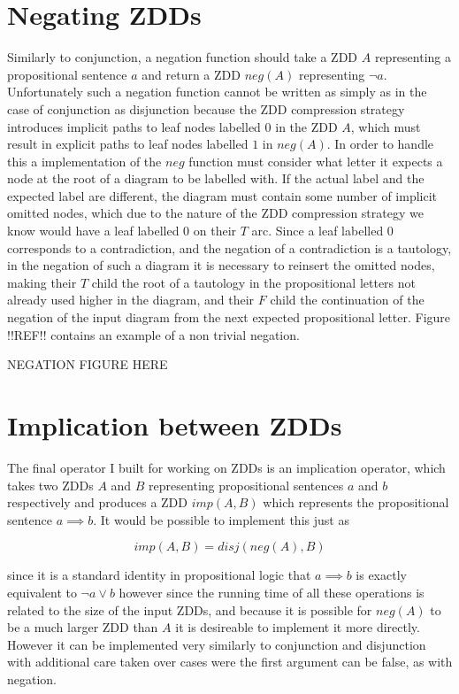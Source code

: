 \documentclass[12pt,a4paper,twoside,openright]{report}
\begin{document}
\section{Negating ZDDs}
Similarly to conjunction, a negation function should take a ZDD $A$ representing a propositional sentence $a$ and return a ZDD $\mathit{neg}(A)$ representing $\neg a$. Unfortunately such a negation function cannot be written as simply as in the case of conjunction as disjunction because the ZDD compression strategy introduces implicit paths to leaf nodes labelled $0$ in the ZDD $A$, which must result in explicit paths to leaf nodes labelled $1$ in $\mathit{neg}(A)$. In order to handle this a implementation of the $\mathit{neg}$ function must consider what letter it expects a node at the root of a diagram to be labelled  with. If the actual label and the expected label are different, the diagram must contain some number of implicit omitted nodes, which due to the nature of the ZDD compression strategy we know would have a leaf labelled $0$ on their $T$ arc. Since a leaf labelled $0$ corresponds to a contradiction, and the negation of a contradiction is a tautology, in the negation of such a diagram it is necessary to reinsert the omitted nodes, making their $T$ child the root of a tautology in the propositional letters not already used higher in the diagram, and their $F$ child the continuation of the negation of the input diagram from the next expected propositional letter. Figure !!REF!! contains an example of a non trivial negation.

NEGATION FIGURE HERE

\section{Implication between ZDDs}
The final operator I built for working on ZDDs is an implication operator, which takes two ZDDs $A$ and $B$ representing propositional sentences $a$ and $b$ respectively and produces a ZDD $\mathit{imp}(A, B)$ which represents the propositional sentence $a\implies b$. It would be possible to implement this just as 

$$
\mathit{imp}(A, B) = \mathit{disj}(\mathit{neg}(A), B)
$$

since it is a standard identity in propositional logic that $a\implies b$ is exactly equivalent to $\neg a\vee b$ however since the running time of all these operations is related to the size of the input ZDDs, and because it is possible for $\mathit{neg}(A)$ to be a much larger ZDD than $A$ it is desireable to implement it more directly. However it can be implemented very similarly to conjunction and disjunction with additional care taken over cases were the first argument can be false, as with negation.
\end{document}

